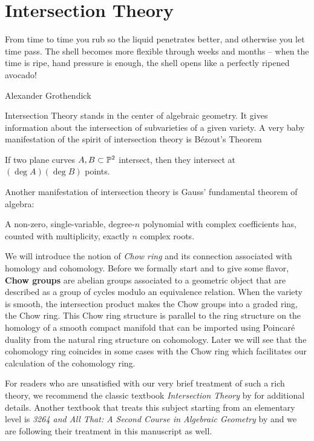 \chapter{Intersection Theory}
\label{chp:intersection-theory}

\epigraph{
From time to time you rub so the liquid penetrates better, and otherwise you let time pass. The shell becomes more flexible through weeks and months -- when the time is ripe, hand pressure is enough, the shell opens like a perfectly ripened avocado!
}{Alexander Grothendick}

Intersection Theory stands in the center of algebraic geometry. 
It gives information about the intersection of subvarieties of a given variety. 
A very baby manifestation of the spirit of intersection theory is 
B\'{e}zout's Theorem

	\begin{theorem}
		If two plane curves $A, B \subset \P^2$ intersect, 
		then they intersect at $(\deg A)(\deg B)$ points. 
	\end{theorem}
	
Another manifestation of intersection theory is Gauss' fundamental theorem of algebra:
	\begin{theorem}
		A non-zero, single-variable, 
		degree-$n$ polynomial with complex coefficients has, 
		counted with multiplicity, exactly 
		$n$ complex roots.
	\end{theorem}
We will introduce the notion of \emph{Chow ring} 
and its connection associated with homology and cohomology. 
Before we formally start and to give some flavor,
\textbf{Chow groups} are abelian groups associated to a geometric object
that are described as a group of cycles modulo an equivalence relation.
When the variety is smooth, 
the intersection product makes the Chow groups into a graded ring,
the Chow ring.
This Chow ring structure is parallel to the ring structure 
on the homology of a smooth compact manifold
that can be imported using Poincar\'{e} duality
from the natural ring structure on cohomology. 
Later we will see that 
the cohomology ring coincides in some cases with the Chow ring which facilitates our calculation of the cohomology ring. 

For readers who are unsatisfied with our very brief treatment of 
such a rich theory, 
we recommend the classic textbook \emph{Intersection Theory} 
by \citet{Fulton1998} for additional details.
Another textbook that treats this subject starting from an elementary level
is \emph{3264 and All That: A Second Course in Algebraic Geometry} by \citet{Eisenbud2016} and we are following their treatment in this manuscript as well. 



	







	











